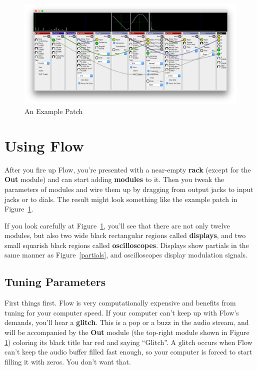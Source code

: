 \documentclass{article}
\newcommand\name{Flow}
\begin{document}
\begin{figure}[t]
\begin{center}\includegraphics[width=6.5in]{screenshot}\end{center}
\vspace{-3em}
\caption{An Example Patch}
\label{screenshot}
\end{figure}


\section{Using {\name}}

After you fire up {\name}, you're presented with a near-empty {\bf rack} (except for the {\bf Out} module) and can start adding {\bf modules} to it.  Then you tweak the parameters of modules and wire them up by dragging from output jacks to input jacks or to dials.  The result might look something like the example patch in Figure~\ref{screenshot}.

If you look carefully at Figure~\ref{screenshot}, you'll see that there are not only twelve modules, but also two wide black rectangular regions called {\bf displays}, and two small squarish black regions called {\bf oscilloscopes}.  Displays show partials in the same manner as Figure~\ref{partials}, and oscilloscopes display modulation signals.

\subsection{Tuning Parameters}
First things first.  {\name} is very computationally expensive and benefits from tuning for your computer speed.  If your computer can't keep up with Flow's demands, you'll hear a {\bf glitch}.  This is a pop or a buzz in the audio stream, and will be accompanied by the {\bf Out} module (the top-right module shown in Figure \ref{screenshot}) coloring its black title bar red and saying ``Glitch''.  A glitch occurs when Flow can't keep the audio buffer filled fast enough, so your computer is forced to start filling it with zeros.  You don't want that.
\end{document}
